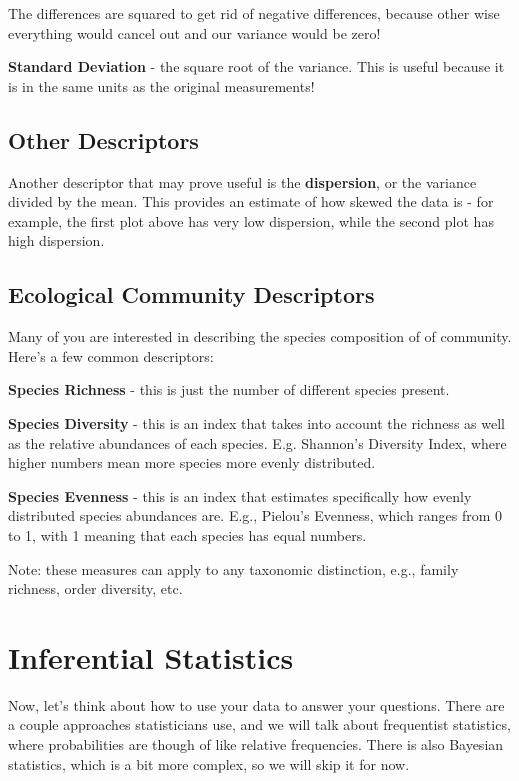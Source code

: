 \documentclass[
  letterpaper,
  DIV=11,
  numbers=noendperiod]{scrreprt}
\begin{document}
The differences are squared to get rid of negative differences, because
other wise everything would cancel out and our variance would be zero!

\textbf{Standard Deviation} - the square root of the variance. This is
useful because it is in the same units as the original measurements!

\hypertarget{other-descriptors}{%
\section{Other Descriptors}\label{other-descriptors}}

Another descriptor that may prove useful is the \textbf{dispersion}, or
the variance divided by the mean. This provides an estimate of how
skewed the data is - for example, the first plot above has very low
dispersion, while the second plot has high dispersion.

\hypertarget{ecological-community-descriptors}{%
\section{Ecological Community
Descriptors}\label{ecological-community-descriptors}}

Many of you are interested in describing the species composition of of
community. Here's a few common descriptors:

\textbf{Species Richness} - this is just the number of different species
present.

\textbf{Species Diversity} - this is an index that takes into account
the richness as well as the relative abundances of each species. E.g.
Shannon's Diversity Index, where higher numbers mean more species more
evenly distributed.

\textbf{Species Evenness} - this is an index that estimates specifically
how evenly distributed species abundances are. E.g., Pielou's Evenness,
which ranges from 0 to 1, with 1 meaning that each species has equal
numbers.

Note: these measures can apply to any taxonomic distinction, e.g.,
family richness, order diversity, etc.

\hypertarget{inferential-statistics}{%
\chapter{Inferential Statistics}\label{inferential-statistics}}

Now, let's think about how to use your data to answer your questions.
There are a couple approaches statisticians use, and we will talk about
frequentist statistics, where probabilities are though of like relative
frequencies. There is also Bayesian statistics, which is a bit more
complex, so we will skip it for now.
\end{document}
